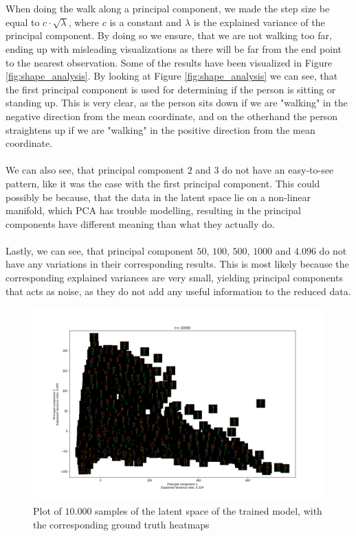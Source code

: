 \documentclass[./main.tex]{subfiles}
\begin{document}
\\
\\
When doing the walk along a principal component, we made the step size be equal to $c \cdot \sqrt{\lambda}$, where $c$ is a constant and $\lambda$ is the explained variance of the principal component. By doing so we ensure, that we are not walking too far, ending up with misleading visualizations as there will be far from the end point to the nearest observation. Some of the results have been visualized in Figure \ref{fig:shape_analysis}.
By looking at Figure \ref{fig:shape_analysis} we can see, that the first principal component is used for determining if the person is sitting or standing up. This is very clear, as the person sits down if we are "walking" in the negative direction from the mean coordinate, and on the otherhand the person straightens up if we are "walking" in the positive direction from the mean coordinate.
\\
\\
We can also see, that  principal component $2$ and $3$ do not have an easy-to-see pattern, like it was the case with the first principal component. This could possibly be because, that the data in the latent space lie on a non-linear manifold, which PCA has trouble modelling, resulting in the principal components have different meaning than what they actually do.
\\
\\
Lastly, we can see, that principal component $50$, $100$, $500$, $1000$ and $4.096$ do not have any variations in their corresponding results. This is most likely because the corresponding explained variances are very small, yielding principal components that acts as noise, as they do not add any useful information to the reduced data.
\begin{figure}[htbp]
    \centering
    \includegraphics[width = \textwidth]{entities/latent_space_all_skeletons.png}
    \caption{Plot of $10.000$ samples of the latent space of the trained model, with the corresponding ground truth heatmaps}
    \label{fig:latent_space_all_skeletons}
\end{figure}
\end{document}
